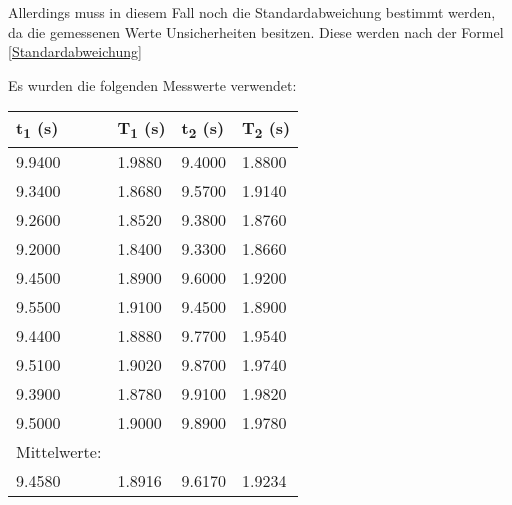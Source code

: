 \documentclass[titlepage=firstcover, captions=tableheading]{scrartcl}
\begin{document}
Allerdings muss in diesem Fall noch die Standardabweichung bestimmt werden, da die gemessenen Werte Unsicherheiten besitzen.
Diese werden nach der Formel \ref{Standardabweichung}


Es wurden die folgenden Messwerte verwendet: 

\begin{minipage}{\linewidth}
\centering
    \centering
    \begin{tabular}{llll}
    \toprule
    t\textsubscript{1} (s) & T\textsubscript{1} (s) & t\textsubscript{2} (s) & T\textsubscript{2} (s) \\
    \midrule
    9.9400  &    1.9880  & 9.4000 & 1.8800 \\
    9.3400  &    1.8680  & 9.5700 & 1.9140 \\
    9.2600  &    1.8520  & 9.3800 & 1.8760 \\
    9.2000  &    1.8400  & 9.3300 & 1.8660 \\
    9.4500  &    1.8900  & 9.6000 & 1.9200 \\
    9.5500  &    1.9100  & 9.4500 & 1.8900 \\
    9.4400  &    1.8880  & 9.7700 & 1.9540 \\
    9.5100  &    1.9020  & 9.8700 & 1.9740 \\
    9.3900  &    1.8780  & 9.9100 & 1.9820 \\
    9.5000  &    1.9000  & 9.8900 & 1.9780 \\
    \midrule
    Mittelwerte:\\
    9.4580 & 1.8916 & 9.6170 & 1.9234  \\
    \bottomrule
    
\end{tabular}
\label{tab:1}
\leavevmode
\newline
\vspace*{1 cm}
\newline
\end{minipage}
\end{document}
